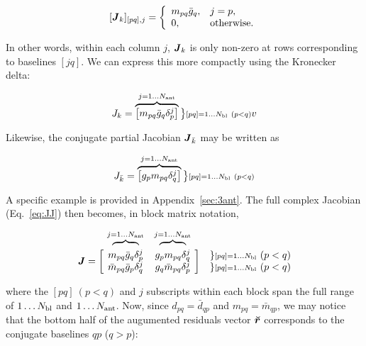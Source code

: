 \documentclass[useAMS,usenatbib]{mn2e}
\newcommand{\mat}[1]{{\bmath{#1}}}
\newcommand{\JJ}{\mat{J}} %
\begin{document}
\[
[ \JJ_k ]_{[pq],j} = \left \{  
  \begin{array}{ll} 
  m_{pq}\bar{g}_q,& j=p, \\
  0, & \mathrm{otherwise.}
  \end{array}
\right .
\]

In other words, within each column $j$, $\JJ_k$ is only non-zero at rows corresponding to baselines $[jq]$. We can express 
this more compactly using the Kronecker delta:


\begin{equation}
\label{eq:Jk}
J_k = \overbrace{ \Matrix{c}{ m_{pq}\bar{g}_q\delta^{j}_p } } ^{j=1\dots \Na} \big \}{\scriptstyle [pq]=1\dots \Nbl~(p<q)}
v\end{equation}

Likewise, the conjugate partial Jacobian $\JJ_{\bar{k}}$ may be written as

\begin{equation}
\label{eq:Jbark}
J_{\bar{k}} = \overbrace{ \Matrix{c}{ g_p m_{pq} \delta^{j}_q } } ^{j=1\dots \Na} \big \}{\scriptstyle [pq]=1\dots \Nbl~(p<q)}
\end{equation}

A specific example is provided in Appendix~\ref{sec:3ant}. The full complex Jacobian (Eq.~\ref{eq:JJ}) then 
becomes, in block matrix notation,

\begin{equation}
\label{eq:JJ:di:basic}
\begin{array}{r@{~}cc@{~}cc}
                & \overbrace{~~~~~~~~}^{j=1\dots \Na} & \overbrace{~~~~~~~~}^{j=1\dots \Na} \\
\JJ = \bigg [ &
  \Stack{ m_{pq}\bar{g}_q\delta^{j}_p \\ \bar{m}_{pq} \bar{g}_p \delta^{j}_q } &
  \Stack{ g_p m_{pq} \delta^{j}_q \\ g_q \bar{m}_{pq} \delta^{j}_p }  
& \bigg ] &
\Stack{ \} {\scriptstyle [pq]=1\dots \Nbl}~(p<q) \\ \} {\scriptstyle [pq]=1\dots \Nbl}~(p<q) }

\end{array}
\end{equation}

where the $[pq]~(p<q)$ and $j$ subscripts within each block span the full range of $1\dots N_\mathrm{bl}$ and $1\dots N_\mathrm{ant}$. Now, 
since $d_{pq} = \bar{d}_{qp}$ and $m_{pq} = \bar{m}_{qp}$, we may notice
that the bottom half of the augumented residuals vector $\Rr$ corresponds to the conjugate baselines 
$qp$ ($q>p$):
\end{document}
